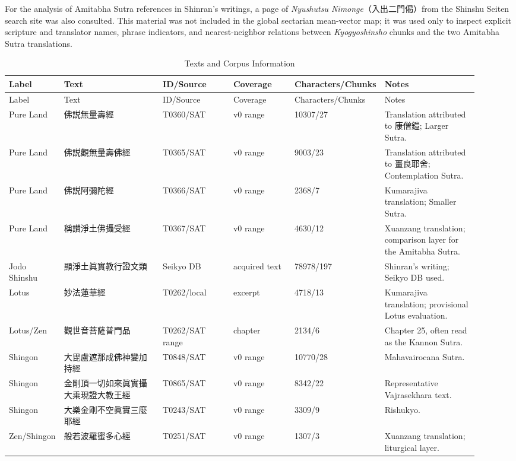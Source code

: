 \documentclass[uplatex,dvipdfmx,11pt,a4paper]{jsarticle}
\begin{document}
For the analysis of Amitabha Sutra references in Shinran's writings, a page of \textit{Nyushutsu Nimonge}（入出二門偈）from the Shinshu Seiten search site was also consulted. This material was not included in the global sectarian mean-vector map; it was used only to inspect explicit scripture and translator names, phrase indicators, and nearest-neighbor relations between \textit{Kyogyoshinsho} chunks and the two Amitabha Sutra translations.

{\footnotesize
\setlength{\tabcolsep}{2pt}
\begin{longtable}{@{}p{0.11\linewidth}p{0.21\linewidth}p{0.15\linewidth}p{0.13\linewidth}p{0.12\linewidth}p{0.20\linewidth}@{}}
\caption{Texts and Corpus Information}\\
\toprule
Label & Text & ID/Source & Coverage & Characters/Chunks & Notes \\
\midrule
\endfirsthead
\toprule
Label & Text & ID/Source & Coverage & Characters/Chunks & Notes \\
\midrule
\endhead
Pure Land & 佛説無量壽經 & T0360/SAT & v0 range & 10307/27 & Translation attributed to 康僧鎧; Larger Sutra. \\
Pure Land & 佛説觀無量壽佛經 & T0365/SAT & v0 range & 9003/23 & Translation attributed to 畺良耶舍; Contemplation Sutra. \\
Pure Land & 佛説阿彌陀經 & T0366/SAT & v0 range & 2368/7 & Kumarajiva translation; Smaller Sutra. \\
Pure Land & 稱讃淨土佛攝受經 & T0367/SAT & v0 range & 4630/12 & Xuanzang translation; comparison layer for the Amitabha Sutra. \\
Jodo Shinshu & 顯淨土眞實教行證文類 & Seikyo DB & acquired text & 78978/197 & Shinran's writing; Seikyo DB used. \\
Lotus & 妙法蓮華經 & T0262/local & excerpt & 4718/13 & Kumarajiva translation; provisional Lotus evaluation. \\
Lotus/Zen & 觀世音菩薩普門品 & T0262/SAT range & chapter & 2134/6 & Chapter 25, often read as the Kannon Sutra. \\
Shingon & 大毘盧遮那成佛神變加持經 & T0848/SAT & v0 range & 10770/28 & Mahavairocana Sutra. \\
Shingon & 金剛頂一切如來眞實攝大乘現證大教王經 & T0865/SAT & v0 range & 8342/22 & Representative Vajrasekhara text. \\
Shingon & 大樂金剛不空眞實三麼耶經 & T0243/SAT & v0 range & 3309/9 & Rishukyo. \\
Zen/Shingon & 般若波羅蜜多心經 & T0251/SAT & v0 range & 1307/3 & Xuanzang translation; liturgical layer. \\

\end{longtable}}
\end{document}
